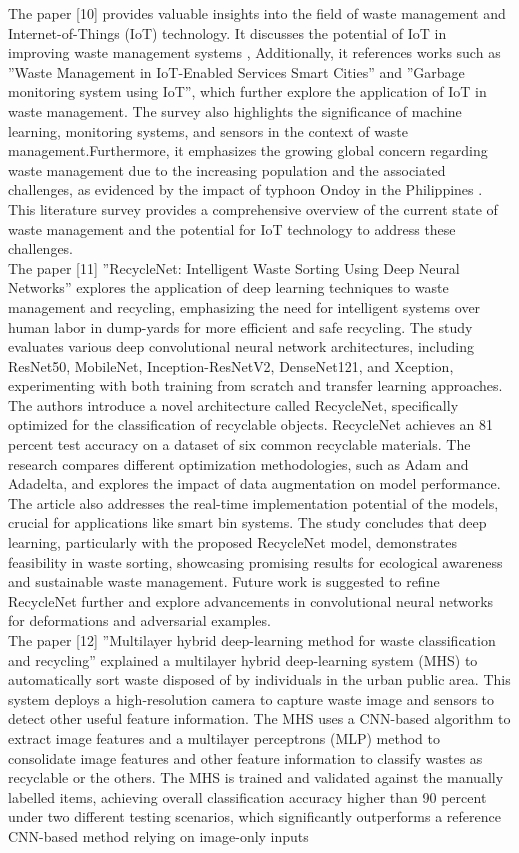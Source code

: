 \documentclass[12pt, English]{article}
\begin{document}
The paper [10] provides valuable insights into the field of waste management and Internet-of-Things (IoT) technology. It discusses the potential of IoT in improving waste management systems , Additionally, it references works such as ”Waste Management in IoT-Enabled Services Smart Cities” and ”Garbage monitoring system using IoT”, which further explore the application of IoT in waste management. The survey also highlights the significance of machine
learning, monitoring systems, and sensors in the context of waste management.Furthermore, it emphasizes the growing global concern regarding waste management due to the increasing population and the associated challenges, as evidenced by the impact of typhoon Ondoy in the Philippines . This literature survey provides a comprehensive overview of the current state of waste management and the
potential for IoT technology to address these challenges.\\

The paper [11] ”RecycleNet: Intelligent Waste Sorting Using Deep Neural Networks” explores the application of deep learning techniques to waste management and recycling, emphasizing the need for intelligent systems over human labor in dump-yards for more efficient and safe recycling. The study evaluates various deep convolutional neural network architectures, including ResNet50, MobileNet,
Inception-ResNetV2, DenseNet121, and Xception, experimenting with both training from scratch and transfer learning approaches. The authors introduce a novel architecture called RecycleNet, specifically optimized for the classification of recyclable objects. RecycleNet achieves an 81 percent test accuracy on a dataset
of six common recyclable materials. The research compares different optimization methodologies, such as Adam and Adadelta, and explores the impact of data augmentation on model performance. The article also addresses the real-time implementation potential of the models, crucial for applications like smart bin systems. The study concludes that deep learning, particularly with the proposed RecycleNet model, demonstrates feasibility in waste sorting, showcasing promising results for ecological awareness and sustainable waste management. Future work is suggested to refine RecycleNet further and explore advancements in convolutional neural networks for deformations and adversarial examples.\\

The paper [12] ”Multilayer hybrid deep-learning method for waste classification and recycling” explained a multilayer hybrid deep-learning system (MHS) to automatically sort waste disposed of by individuals in the urban public area. This system deploys a high-resolution camera to capture waste image and sensors to detect other useful feature information. The MHS uses a CNN-based algorithm to
extract image features and a multilayer perceptrons (MLP) method to consolidate image features and other feature information to classify wastes as recyclable or the others. The MHS is trained and validated against the manually labelled items, achieving overall classification accuracy higher than 90 percent under two different testing scenarios, which significantly outperforms a reference CNN-based
method relying on image-only inputs\\
\end{document}
